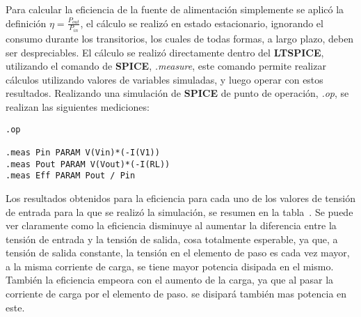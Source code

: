 \vspace{1.5cm}

Para calcular la eficiencia de la fuente de alimentación simplemente se aplicó la definición $\eta = \frac{P_{out}}{P_{in}}$, el cálculo se realizó en estado estacionario, ignorando el consumo durante los transitorios, los cuales de todas formas, a largo plazo, deben ser despreciables. El cálculo se realizó directamente dentro del \textbf{LTSPICE}, utilizando el comando de \textbf{SPICE}, \textit{.measure}, este comando permite realizar cálculos utilizando valores de variables simuladas, y luego operar con estos resultados. Realizando una simulación de \textbf{SPICE} de punto de operación, \textit{.op}, se realizan las siguientes mediciones:

\lstset{language=,xleftmargin=1em,numbers=none}

\lstset{showspaces=false}
\lstset{showstringspaces=false}
\normalfont
\normalsize
{}


\lstset{tabsize=4}

\lstset{numbersep=5pt}

\lstset{inputencoding=utf8/latin1}



\fontsize{10pt}{11pt}
\selectfont


\begin{lstlisting}
.op

.meas Pin PARAM V(Vin)*(-I(V1))
.meas Pout PARAM V(Vout)*(-I(RL))
.meas Eff PARAM Pout / Pin
\end{lstlisting}



Los resultados obtenidos para la eficiencia para cada uno de los valores de tensión de entrada para la que se realizó la simulación, se resumen en la tabla~. Se puede ver claramente como la eficiencia disminuye al aumentar la diferencia entre la tensión de entrada y la tensión de salida, cosa totalmente esperable, ya que, a tensión de salida constante, la tensión en el elemento de paso es cada vez mayor, a la misma corriente de carga, se tiene mayor potencia disipada en el mismo.\\
También la eficiencia empeora con el aumento de la carga, ya que al pasar la corriente de carga por el elemento de paso. se disipará también mas potencia en este.\\


